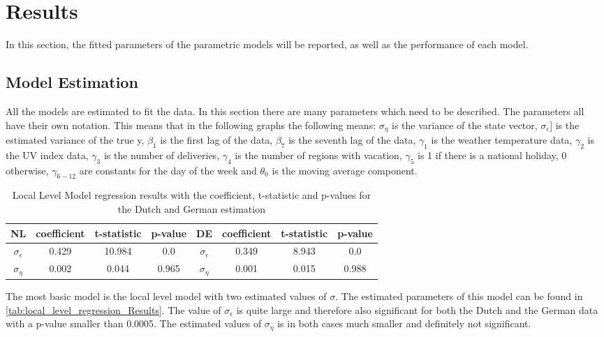 \section{Results}
\label{seq:results}
In this section, the fitted parameters of the parametric models will be reported, as well as the performance of each model.
\subsection{Model Estimation}
\label{subseq:model estimation}
All the models are estimated to fit the data. In this section there are many parameters which need to be described. The parameters all have their own notation. This means that in the following graphs the following means: $\sigma_{\eta}$ is the variance of the state vector, $\sigma_{\epsilon}$] is the estimated variance of the true y, $\beta_1$ is the first lag of the data, $\beta_7$ is the seventh lag of the data, $\gamma_1$ is the weather temperature data, $\gamma_2$ is the UV index data, $\gamma_3$ is the number of deliveries, $\gamma_4$ is the number of regions with vacation, $\gamma_5$ is 1 if there is a national holiday, 0 otherwise, $\gamma_{6-12}$  are constants for the day of the week and $\theta_0$ is the moving average component.\\

\begin{table}[]
    \centering
    \begin{tabular}{|c|c c c||c|c c c|}\hline
        NL & coefficient & t-statistic & p-value & DE & coefficient & t-statistic & p-value\\\hline        
        $\sigma_{\epsilon}$ & 0.429 & 10.984 & 0.0 & $\sigma_{\epsilon}$ & 0.349 & 8.943 & 0.0\\
        $\sigma_{\eta}$ & 0.002 & 0.044 & 0.965 & $\sigma_{\eta}$ & 0.001 & 0.015 & 0.988\\\hline
    \end{tabular}
    \caption{Local Level Model regression results with the coefficient, t-statistic and p-values for the Dutch and German estimation}
    \label{tab:local_level_regression_Results}
\end{table}
The most basic model is the local level model with two estimated values of $\sigma$. The estimated parameters of this model can be found in \autoref{tab:local_level_regression_Results}. The value of $\sigma_{\epsilon}$ is quite large and therefore also significant for both the Dutch and the German data with a p-value smaller than 0.0005. The estimated values of $\sigma_{\eta}$  is in both cases much smaller and definitely not significant.\\

